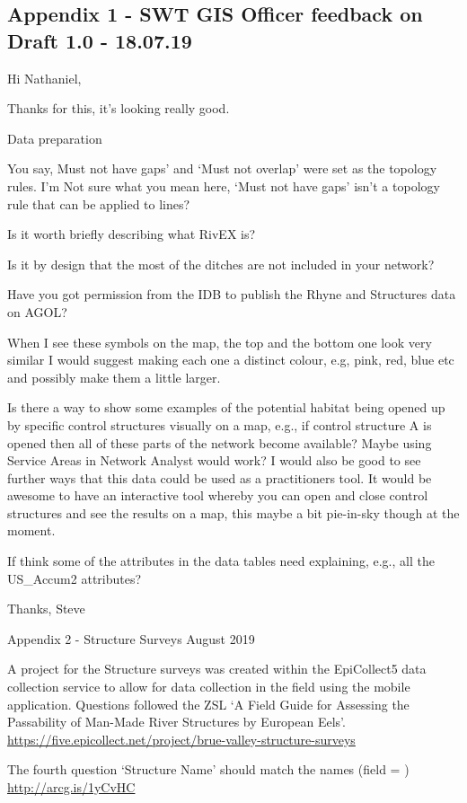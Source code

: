\documentclass[]{article}
\begin{document}
\hypertarget{appendix-1---swt-gis-officer-feedback-on-draft-1.0---18.07.19}{%
\subsection{Appendix 1 - SWT GIS Officer feedback on Draft 1.0 -
18.07.19}\label{appendix-1---swt-gis-officer-feedback-on-draft-1.0---18.07.19}}

Hi Nathaniel,

Thanks for this, it's looking really good.

Data preparation

You say, Must not have gaps' and `Must not overlap' were set as the
topology rules. I'm Not sure what you mean here, `Must not have gaps'
isn't a topology rule that can be applied to lines?

Is it worth briefly describing what RivEX is?

Is it by design that the most of the ditches are not included in your
network?

Have you got permission from the IDB to publish the Rhyne and Structures
data on AGOL?

When I see these symbols on the map, the top and the bottom one look
very similar I would suggest making each one a distinct colour, e.g,
pink, red, blue etc and possibly make them a little larger.

Is there a way to show some examples of the potential habitat being
opened up by specific control structures visually on a map, e.g., if
control structure A is opened then all of these parts of the network
become available? Maybe using Service Areas in Network Analyst would
work? I would also be good to see further ways that this data could be
used as a practitioners tool. It would be awesome to have an interactive
tool whereby you can open and close control structures and see the
results on a map, this maybe a bit pie-in-sky though at the moment.

If think some of the attributes in the data tables need explaining,
e.g., all the US\_Accum2 attributes?

Thanks, Steve

Appendix 2 - Structure Surveys August 2019

A project for the Structure surveys was created within the EpiCollect5
data collection service to allow for data collection in the field using
the mobile application. Questions followed the ZSL `A Field Guide for
Assessing the Passability of Man-Made River Structures by European
Eels'.
\url{https://five.epicollect.net/project/brue-valley-structure-surveys}

The fourth question `Structure Name' should match the names (field = )
\url{http://arcg.is/1yCvHC}
\end{document}
